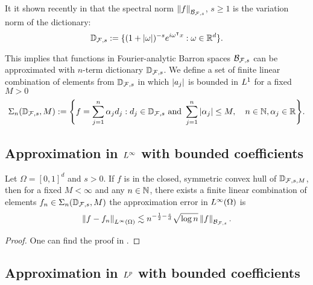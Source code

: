 It it shown recently in \cite{siegelSharpBoundsApproximation2022} that the
spectral norm $\left\| f \right\|_{\mathcal{B}_{\mathcal{F}, s}}$, $s \geq 1$ is the variation
norm of the dictionary:
\begin{equation}
    \mathbb{D}_{\mathcal{F}, s} := \{
        (1 + \left| \omega \right|)^{-s} e^{i\omega{}^{\intercal} x}: \omega \in \mathbb{R}^d
    \}.
\end{equation}

This implies that functions in Fourier-analytic Barron spaces $\mathcal{B}_{\mathcal{F},
s}$ can be approximated with $n$-term dictionary $\mathbb{D}_{\mathcal{F}, s}$. We
define a set of finite linear combination of elements from
$\mathbb{D}_{\mathcal{F},s}$ in which $\left| a_j \right|$ is bounded in $L^{1}$ for a
fixed $M > 0$
\begin{equation}
    \Sigma_n(\mathbb{D}_{\mathcal{F}, s}, M) := \Bigg\{
        f = \sum_{j=1}^n \alpha_j d_j: 
        d_j \in \mathbb{D}_{\mathcal{F}, s} \textnormal{ and } 
        \sum_{j=1}^n \left| \alpha_j \right| \leq M, \quad 
        n \in \mathbb{N}, \alpha_j \in \mathbb{R}
    \Bigg\}.
\end{equation}


\subsection{Approximation in $L^{\infty}$ with bounded coefficients}

\begin{theorem}
    Let $\Omega = [0,1]^d$ and $s > 0$. If $f$ is in the closed, symmetric
    convex hull of $\mathbb{D}_{\mathcal{F}, s, M}$, then for a fixed $M<\infty$
    and any $n \in \mathbb{N}$, there exists a finite linear combination of elements
    $f_n \in \Sigma_n(\mathbb{D}_{\mathcal{F}, s}, M)$ the approximation error in
    $L^{\infty}(\Omega)$ is
    \begin{equation}
        \left\| f-f_n \right\|_{L^{\infty}(\Omega)} \lesssim 
        n^{-\frac{1}{2}-\frac{s}{d}} \sqrt{\log{n}} \left\| f \right\|_{\mathcal{B}_{\mathcal{F},s}}.
    \end{equation}

\end{theorem}

\begin{proof}
    One can find the proof in
    \cite{klusowskiApproximationCombinationsReLU2018,siegelSharpBoundsApproximation2022}.
\end{proof}

\subsection{Approximation in $L^{p}$ with bounded coefficients}

